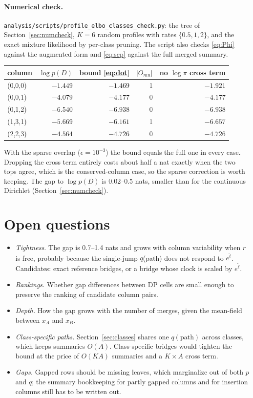 \documentclass[11pt]{article}
\begin{document}
\paragraph{Numerical check.}
\texttt{analysis/scripts/profile\_elbo\_classes\_check.py}: the tree of
Section~\ref{sec:numcheck}, $K=6$ random profiles with rates
$\{0.5,1,2\}$, and the exact mixture likelihood by per-class pruning. The
script also checks \eqref{eq:Phi} against the augmented form and
\eqref{eq:sep} against the full merged summary.

\begin{center}
\begin{tabular}{lrrrr}
\toprule
column & $\log p(D)$ & bound \eqref{eq:dot} & $|O_{mn}|$ &
 no $\log\pi$ cross term\\
\midrule
(0,0,0) & $-1.449$ & $-1.469$ & 1 & $-1.921$\\
(0,0,1) & $-4.079$ & $-4.177$ & 0 & $-4.177$\\
(0,1,2) & $-6.540$ & $-6.938$ & 0 & $-6.938$\\
(1,3,1) & $-5.669$ & $-6.161$ & 1 & $-6.657$\\
(2,2,3) & $-4.564$ & $-4.726$ & 0 & $-4.726$\\
\bottomrule
\end{tabular}
\end{center}

With the sparse overlap ($\epsilon=10^{-3}$) the bound equals the full one in
every case. Dropping the cross term entirely costs about half a nat exactly
when the two tops agree, which is the conserved-column case, so the sparse
correction is worth keeping. The gap to $\log p(D)$ is 0.02--0.5 nats, smaller
than for the continuous Dirichlet (Section~\ref{sec:numcheck}).

\section{Open questions}
\begin{itemize}
\item \emph{Tightness.} The gap is 0.7--1.4 nats and grows with column
  variability when $r$ is free, probably because the single-jump $q$(path) does
  not respond to $e^{\tilde\ell}$. Candidates: exact reference bridges, or a bridge
  whose clock is scaled by $e^{\tilde\ell}$.
\item \emph{Rankings.} Whether gap differences between DP cells are small
  enough to preserve the ranking of candidate column pairs.
\item \emph{Depth.} How the gap grows with the number of merges, given the
  mean-field between $x_A$ and $x_B$.
\item \emph{Class-specific paths.} Section~\ref{sec:classes} shares one
  $q(\text{path})$ across classes, which keeps summaries $O(A)$. Class-specific
  bridges would tighten the bound at the price of $O(KA)$ summaries and a
  $K\times A$ cross term.
\item \emph{Gaps.} Gapped rows should be missing leaves, which marginalize out
  of both $p$ and $q$; the summary bookkeeping for partly gapped columns and
  for insertion columns still has to be written out.
\end{itemize}
\end{document}
